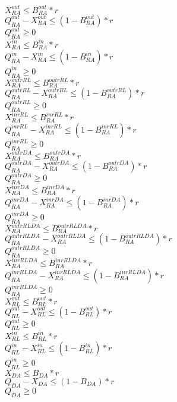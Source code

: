 $X^{out}_{RA} \leq B^{out}_{RA} * r$ \\
$Q^{out}_{RA} - X^{out}_{RA} \leq (1-B^{out}_{RA}) * r$ \\
$Q^{out}_{RA} \geq 0$ \\
$X^{in}_{RA} \leq B^{in}_{RA} * r$ \\
$Q^{in}_{RA} - X^{in}_{RA} \leq (1-B^{in}_{RA}) * r$ \\
$Q^{in}_{RA} \geq 0$ \\
$X^{outrRL}_{RA} \leq B^{outrRL}_{RA} * r$ \\
$Q^{outrRL}_{RA} - X^{outrRL}_{RA} \leq (1-B^{outrRL}_{RA}) * r$ \\
$Q^{outrRL}_{RA} \geq 0$ \\
$X^{inrRL}_{RA} \leq B^{inrRL}_{RA} * r$ \\
$Q^{inrRL}_{RA} - X^{inrRL}_{RA} \leq (1-B^{inrRL}_{RA}) * r$ \\
$Q^{inrRL}_{RA} \geq 0$ \\
$X^{outrDA}_{RA} \leq B^{outrDA}_{RA} * r$ \\
$Q^{outrDA}_{RA} - X^{outrDA}_{RA} \leq (1-B^{outrDA}_{RA}) * r$ \\
$Q^{outrDA}_{RA} \geq 0$ \\
$X^{inrDA}_{RA} \leq B^{inrDA}_{RA} * r$ \\
$Q^{inrDA}_{RA} - X^{inrDA}_{RA} \leq (1-B^{inrDA}_{RA}) * r$ \\
$Q^{inrDA}_{RA} \geq 0$ \\
$X^{outrRLDA}_{RA} \leq B^{outrRLDA}_{RA} * r$ \\
$Q^{outrRLDA}_{RA} - X^{outrRLDA}_{RA} \leq (1-B^{outrRLDA}_{RA}) * r$ \\
$Q^{outrRLDA}_{RA} \geq 0$ \\
$X^{inrRLDA}_{RA}  \leq B^{inrRLDA}_{RA} * r$ \\
$Q^{inrRLDA}_{RA}  - X^{inrRLDA}_{RA} \leq (1-B^{inrRLDA}_{RA}) * r$ \\
$Q^{inrRLDA}_{RA}  \geq 0$ \\



$X^{out}_{RL} \leq B^{out}_{RL} * r$ \\
$Q^{out}_{RL} - X^{out}_{RL} \leq (1-B^{out}_{RL}) * r$ \\
$Q^{out}_{RL} \geq 0$ \\
$X^{in}_{RL} \leq B^{in}_{RL} * r$ \\
$Q^{in}_{RL} - X^{in}_{RL} \leq (1-B^{in}_{RL}) * r$ \\
$Q^{in}_{RL} \geq 0$ \\
$X_{DA} \leq B_{DA} * r$ \\
$Q_{DA} - X_{DA} \leq (1-B_{DA}) * r$ \\
$Q_{DA} \geq 0$ \\


